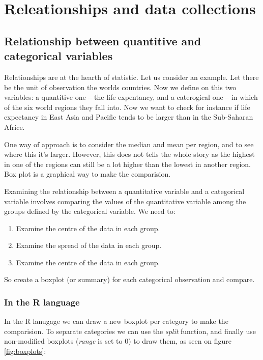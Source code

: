 \chapter*{Releationships and data collections}
\setcounter{section}{0}
\renewcommand*{\theHsection}{ch2.\the\value{section}}

\section{Relationship between quantitive and categorical variables}

Relationships are at the hearth of statistic. Let us consider an example. Let
there be the unit of observation the worlds countries. Now we define on this two
variables: a quantitive one -- the life expentancy, and a caterogical one -- in
which of the six world regions they fall into. Now we want to check for instance
if life expectancy in East Asia and Pacific tends to be larger than in the
Sub-Saharan Africe. 

One way of approach is to consider the median and mean per region, and to see
where this it's larger. However, this does not tells the whole story as the
highest in one of the regions can still be a lot higher than the lowest in
another region. Box plot is a graphical way to make the comparision.

Examining the relationship between a quantitative variable and a categorical
variable involves comparing the values of the quantitative variable among the
groups defined by the categorical variable. We need to:

\begin{enumerate}
  \item Examine the centre of the data in each group.
  \item Examine the spread of the data in each group.
  \item Examine the centre of the data in each group. 
\end{enumerate}

So create a boxplot (or summary) for each categorical observation and compare.

\subsection{In the R language}

In the R lanugage we can draw a new boxplot per category to make the
comparision. To separate categories we can use the \emph{split} function, and
finally use non-modified boxplots (\emph{range} is set to $0$) to draw them,
as seen on figure \ref{fig:boxplots}: 

